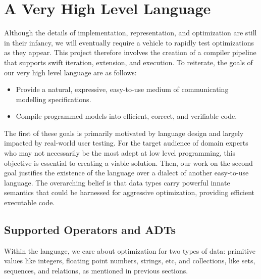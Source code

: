 \documentclass{article}
\begin{document}
\section{A Very High Level Language}

Although the details of implementation, representation, and optimization are still in their infancy, we will eventually require a vehicle to rapidly test optimizations as they appear. This project therefore involves the creation of a compiler pipeline that supports swift iteration, extension, and execution. To reiterate, the goals of our very high level language are as follows:
\begin{itemize}
  \item Provide a natural, expressive, easy-to-use medium of communicating modelling specifications.
  \item Compile programmed models into efficient, correct, and verifiable code.
\end{itemize}
The first of these goals is primarily motivated by language design and largely impacted by real-world user testing. For the target audience of domain experts who may not necessarily be the most adept at low level programming, this objective is essential to creating a viable solution. Then, our work on the second goal justifies the existence of the language over a dialect of another easy-to-use language. The overarching belief is that data types carry powerful innate semantics that could be harnessed for aggressive optimization, providing efficient executable code.

\subsection{Supported Operators and ADTs}
Within the language, we care about optimization for two types of data: primitive values like integers, floating point numbers, strings, etc, and collections, like sets, sequences, and relations, as mentioned in previous sections.
\end{document}
